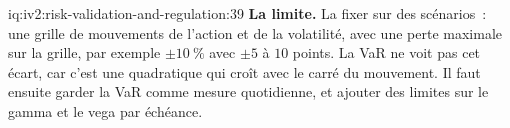 \begin{solution}{iq:iv2:risk-validation-and-regulation:39}
\textbf{La limite.} La fixer sur des scénarios~: une grille de mouvements de l'action et de la volatilité, avec une perte maximale sur la grille, par exemple $\pm 10~\%$ avec $\pm 5$ à $10$ points. La VaR ne voit pas cet écart, car c'est une quadratique qui croît avec le carré du mouvement. Il faut ensuite garder la VaR comme mesure quotidienne, et ajouter des limites sur le gamma et le vega par échéance.

\end{solution}

